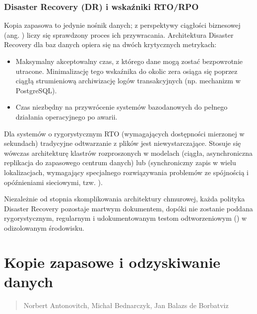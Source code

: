\documentclass[a4paper,11pt,english,openany,oneside]{sphinxmanual}
\begin{document}
\subsubsection{Disaster Recovery (DR) i wskaźniki RTO/RPO}
\label{\detokenize{rozdzial_2/rozdzial_27/rozdzial_6:disaster-recovery-dr-i-wskazniki-rto-rpo}}
\sphinxAtStartPar
Kopia zapasowa to jedynie nośnik danych; z perspektywy ciągłości biznesowej (ang. ) liczy się sprawdzony proces ich przywracania. Architektura Disaster Recovery dla baz danych opiera się na dwóch krytycznych metrykach:
\begin{itemize}
\item {} 
\sphinxAtStartPar
{} Maksymalny akceptowalny czas, z którego dane mogą zostać bezpowrotnie utracone. Minimalizację tego wskaźnika do okolic zera osiąga się poprzez ciągłą strumieniową archiwizację logów transakcyjnych (np. mechanizm  w PostgreSQL).

\item {} 
\sphinxAtStartPar
{} Czas niezbędny na przywrócenie systemów bazodanowych do pełnego działania operacyjnego po awarii.

\end{itemize}

\sphinxAtStartPar
Dla systemów o rygorystycznym RTO (wymagających dostępności mierzonej w sekundach) tradycyjne odtwarzanie z plików jest niewystarczające. Stosuje się wówczas architekturę klastrów rozproszonych w modelach  (ciągła, asynchroniczna replikacja do zapasowego centrum danych) lub  (synchroniczny zapis w wielu lokalizacjach, wymagający specjalnego rozwiązywania problemów ze spójnością i opóźnieniami sieciowymi, tzw. ).

\sphinxAtStartPar
Niezależnie od stopnia skomplikowania architektury chmurowej, każda polityka Disaster Recovery pozostaje martwym dokumentem, dopóki nie zostanie poddana rygorystycznym, regularnym i udokumentowanym testom odtworzeniowym () w odizolowanym środowisku.

\sphinxstepscope


\section{Kopie zapasowe i odzyskiwanie danych}
\label{\detokenize{rozdzial_2/rozdzial_28/index:kopie-zapasowe-i-odzyskiwanie-danych}}\label{\detokenize{rozdzial_2/rozdzial_28/index::doc}}\begin{quote}\begin{description}
\sphinxAtStartPar
Norbert Antonovitch, Michał Bednarczyk, Jan Balazs de Borbatviz

\end{description}\end{quote}
\end{document}
